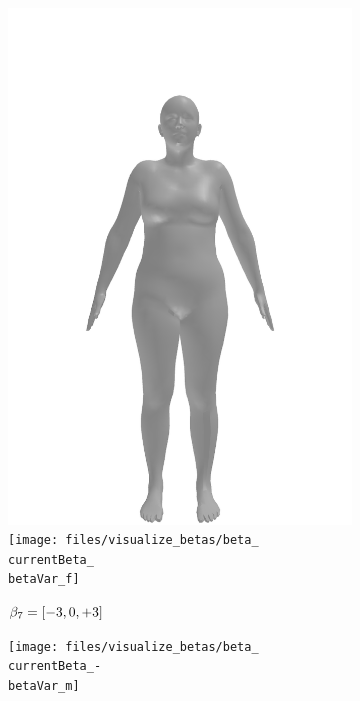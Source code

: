 \begin{figure}[ht!]
\begin{subfigure}{\betaWidth}
        \includegraphics[width=\imgWidth]{files/visualize_betas/baseline_f}
        \texttt{[image: files/visualize\_betas/beta\_\\currentBeta\_\\betaVar\_f]}
        \caption{$\beta_7 = [-3, 0, +3]$}
    \end{subfigure}
    \begin{subfigure}{\betaWidth}
        \def\currentBeta{7}
        \centering
        \texttt{[image: files/visualize\_betas/beta\_\\currentBeta\_-\\betaVar\_m]}

\end{subfigure}
\end{figure}
